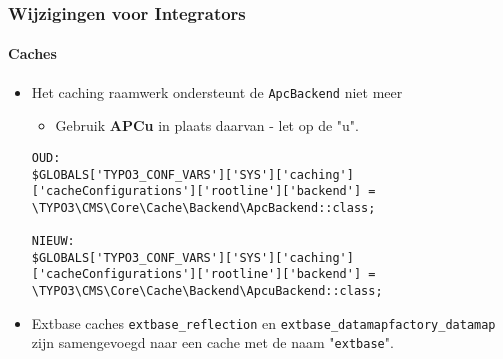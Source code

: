 \begin{frame}[fragile]
	\frametitle{Wijzigingen voor Integrators}
	\framesubtitle{Caches}

	\lstset{basicstyle=\tiny\ttfamily}

	\begin{itemize}
		\item Het caching raamwerk ondersteunt de \texttt{ApcBackend} niet meer

			\begin{itemize}\smaller
				\item[\ding{228}] Gebruik \textbf{APCu} in plaats daarvan - let op de "u".
			\end{itemize}

\begin{lstlisting}
OUD:
$GLOBALS['TYPO3_CONF_VARS']['SYS']['caching']['cacheConfigurations']['rootline']['backend'] =
\TYPO3\CMS\Core\Cache\Backend\ApcBackend::class;

NIEUW:
$GLOBALS['TYPO3_CONF_VARS']['SYS']['caching']['cacheConfigurations']['rootline']['backend'] =
\TYPO3\CMS\Core\Cache\Backend\ApcuBackend::class;
\end{lstlisting}

		\item Extbase caches \texttt{extbase\_reflection} en \texttt{extbase\_datamapfactory\_datamap}
			zijn samengevoegd naar een cache met de naam "\texttt{extbase}".

	\end{itemize}

\end{frame}


